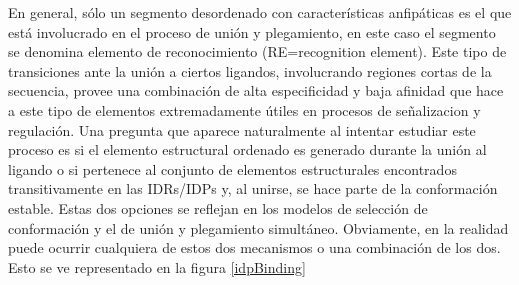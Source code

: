 En general, sólo un segmento desordenado con características anfipáticas es el que está involucrado en el proceso de unión y plegamiento, en este caso el segmento se denomina elemento de reconocimiento (RE=recognition element). 
Este tipo de transiciones ante la unión a ciertos ligandos, involucrando regiones cortas de la secuencia, provee una combinación de alta especificidad y 
baja afinidad que hace a este tipo de elementos extremadamente útiles en procesos de señalizacion y regulación.
Una pregunta que aparece naturalmente al intentar estudiar este proceso es si el elemento estructural ordenado es generado durante la unión al ligando 
o si pertenece al conjunto de elementos estructurales encontrados transitivamente en las IDRs/IDPs y, al unirse, se hace parte de la conformación estable.
Estas dos opciones se reflejan en los modelos de selección de conformación y el de unión y plegamiento simultáneo.
Obviamente, en la realidad puede ocurrir cualquiera de estos dos mecanismos o una combinación de los dos.
Esto se ve representado en la figura \ref{idpBinding}


